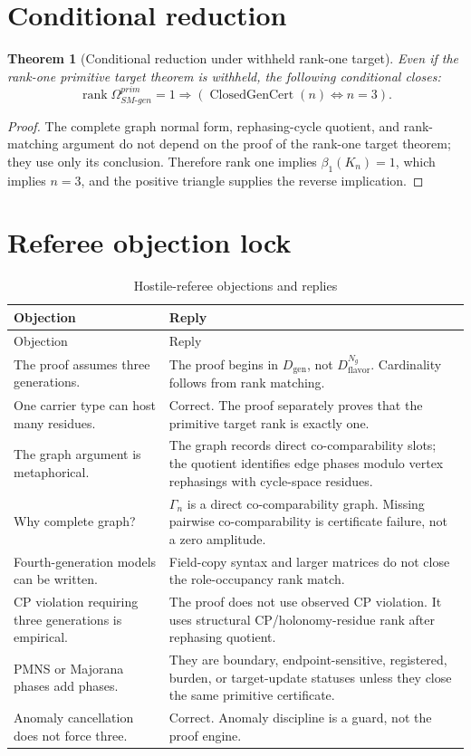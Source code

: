 \documentclass[11pt]{article}
\newcommand{\Dgen}{D_{\mathrm{gen}}}
\newcommand{\DflavNg}{D_{\mathrm{flavor}}^{N_g}}
\newcommand{\ClosedGenCert}{\operatorname{ClosedGenCert}}
\newcommand{\rank}{\operatorname{rank}}
\theoremstyle{definition}
\theoremstyle{plain}
\newtheorem{theorem}{Theorem}[section]
\theoremstyle{remark}
\begin{document}
\section{Conditional reduction}

\begin{theorem}[Conditional reduction under withheld rank-one target]
Even if the rank-one primitive target theorem is withheld, the following conditional closes:
\[
\rank\Omega_{SM\text{-}gen}^{prim}=1
\Rightarrow
(\ClosedGenCert(n)\Longleftrightarrow n=3).
\]
\end{theorem}
\begin{proof}
The complete graph normal form, rephasing-cycle quotient, and rank-matching argument do not depend on the proof of the rank-one target theorem; they use only its conclusion. Therefore rank one implies \(\beta_1(K_n)=1\), which implies \(n=3\), and the positive triangle supplies the reverse implication.
\end{proof}

\section{Referee objection lock}

\begin{longtable}{L{0.32\textwidth}L{0.58\textwidth}}
\caption{Hostile-referee objections and replies}\label{tab:objections}\\
\toprule
Objection & Reply\\
\midrule
\endfirsthead
\toprule
Objection & Reply\\
\midrule
\endhead
The proof assumes three generations. & The proof begins in \(\Dgen\), not \(\DflavNg\). Cardinality follows from rank matching.\\
One carrier type can host many residues. & Correct. The proof separately proves that the primitive target rank is exactly one.\\
The graph argument is metaphorical. & The graph records direct co-comparability slots; the quotient identifies edge phases modulo vertex rephasings with cycle-space residues.\\
Why complete graph? & \(\Gamma_n\) is a direct co-comparability graph. Missing pairwise co-comparability is certificate failure, not a zero amplitude.\\
Fourth-generation models can be written. & Field-copy syntax and larger matrices do not close the role-occupancy rank match.\\
CP violation requiring three generations is empirical. & The proof does not use observed CP violation. It uses structural CP/holonomy-residue rank after rephasing quotient.\\
PMNS or Majorana phases add phases. & They are boundary, endpoint-sensitive, registered, burden, or target-update statuses unless they close the same primitive certificate.\\
Anomaly cancellation does not force three. & Correct. Anomaly discipline is a guard, not the proof engine.\\
\bottomrule
\end{longtable}
\end{document}
